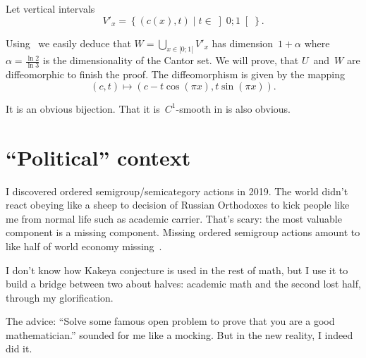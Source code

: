 \documentclass[oneside,draft]{amsart}
\newcommand{\setcond}[2]{\left\{#1\mid#2\right\}}
\begin{document}
Let vertical intervals \[ V'_x = \setcond{(c(x), t)}{t\in\left]0;1\right[}. \]

Using~\cite{189275} we easily deduce that $W=\bigcup_{x\in[0;1[}V'_x$ has dimension~$1+\alpha$ where $\alpha=\frac{\ln 2}{\ln 3}$ is the dimensionality of the Cantor set. We will prove, that $U$~and~$W$ are diffeomorphic to finish the proof. The diffeomorphism is given by the mapping \[ (c,t) \mapsto (c-t\cos(\pi x), t\sin(\pi x)). \]

It is an obvious bijection. That it is~$C^1$-smooth in is also obvious.

\section{``Political'' context}

I discovered ordered semigroup/semicategory actions in 2019. The world didn't react obeying like a sheep to decision of Russian Orthodoxes to kick people like me from normal life such as academic carrier. That's scary: the most valuable component is a missing component. Missing ordered semigroup actions amount to like half of world economy missing~\cite{osa-important}.

I don't know how Kakeya conjecture is used in the rest of math, but I use it to build a bridge between two about halves: academic math and the second lost half, through my glorification.

The advice: ``Solve some famous open problem to prove that you are a good mathematician.'' sounded for me like a mocking. But in the new reality, I indeed did it.



\end{document}
